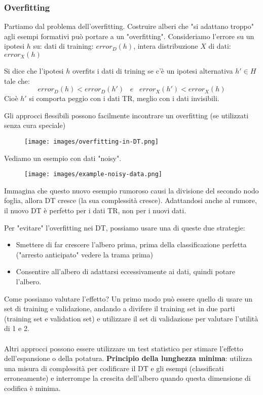 \subsubsection{Overfitting}
Partiamo dal problema dell'overfitting. Costruire alberi che "si adattano troppo" agli esempi formativi può portare a un "overfitting". 
Consideriamo l'errore su un ipotesi $h$ su: dati di training: $error_D(h)$, intera distribuzione $X$ di dati: $error_X(h)$
\begin{definition}
    Si dice che l'ipotesi $h$ overfits i dati di trining se c'è un ipotesi alternativa $h' \in H$ tale che:
    $$error_D(h) < error_D(h') \hspace{10pt}e\hspace{10pt} error_X(h') < error_X(h)$$
    Cioè $h'$ si comporta peggio con i dati TR, meglio con i dati invisibili.
\end{definition}
\hspace{-15pt}Gli approcci flessibili possono facilmente incontrare un overfitting (se utilizzati senza cura speciale)
\begin{figure}[h!]
    \centering
    \texttt{[image: images/overfitting-in-DT.png]}
\end{figure}
\begin{example}
    Vediamo un esempio con dati "noisy".
    \begin{figure}[h!]
        \centering
        \texttt{[image: images/example-noisy-data.png]}
    \end{figure}

    \hspace{-15pt}Immagina che questo nuovo esempio rumoroso causi la divisione del secondo nodo foglia, allora DT cresce (la sua complessità cresce).
    Adattandosi anche al rumore, il nuovo DT è perfetto per i dati TR, non per i nuovi dati.
\end{example}
\hspace{-15pt}Per "evitare" l'overfitting nei DT, possiamo usare una di queste due strategie:
\begin{itemize}
    \item Smettere di far crescere l'albero prima, prima della classificazione perfetta ("arresto anticipato" vedere la trama prima)
    \item Consentire all'albero di adattarsi eccessivamente ai dati, quindi potare l'albero.
\end{itemize}
Come possiamo valutare l'effetto? Un primo modo può essere quello di usare un set di training e validazione, andando a divifere il training set
in due parti (training set e validation set) e utilizzare il set di validazione per valutare l'utilità di 1 e 2.\\\\
Altri approcci possono essere utilizzare un test statistico per stimare l'effetto dell'espansione o della potatura. \textbf{Principio della lunghezza minima}:
utilizza una misura di complessità per codificare il DT e gli esempi (classificati erroneamente) e interrompe la crescita dell'albero quando questa dimensione di codifica è minima.

